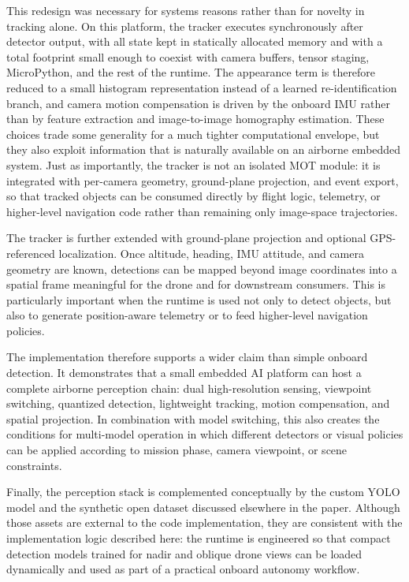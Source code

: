 This redesign was necessary for systems reasons rather than for novelty
in tracking alone. On this platform, the tracker executes synchronously
after detector output, with all state kept in statically allocated
memory and with a total footprint small enough to coexist with camera
buffers, tensor staging, MicroPython, and the rest of the runtime. The
appearance term is therefore reduced to a small histogram representation
instead of a learned re-identification branch, and camera motion
compensation is driven by the onboard IMU rather than by feature
extraction and image-to-image homography estimation. These choices trade
some generality for a much tighter computational envelope, but they also
exploit information that is naturally available on an airborne embedded
system. Just as importantly, the tracker is not an isolated MOT module:
it is integrated with per-camera geometry, ground-plane projection, and
event export, so that tracked objects can be consumed directly by flight
logic, telemetry, or higher-level navigation code rather than remaining
only image-space trajectories.

The tracker is further extended with ground-plane projection and
optional GPS-referenced localization. Once altitude, heading, IMU
attitude, and camera geometry are known, detections can be mapped beyond
image coordinates into a spatial frame meaningful for the drone and for
downstream consumers. This is particularly important when the runtime is
used not only to detect objects, but also to generate position-aware
telemetry or to feed higher-level navigation policies.

The implementation therefore supports a wider claim than simple onboard
detection. It demonstrates that a small embedded AI platform can host a
complete airborne perception chain: dual high-resolution sensing,
viewpoint switching, quantized detection, lightweight tracking, motion
compensation, and spatial projection. In combination with model
switching, this also creates the conditions for multi-model operation in
which different detectors or visual policies can be applied according to
mission phase, camera viewpoint, or scene constraints.

Finally, the perception stack is complemented conceptually by the custom
YOLO model and the synthetic open dataset discussed elsewhere in the
paper. Although those assets are external to the code implementation,
they are consistent with the implementation logic described here: the
runtime is engineered so that compact detection models trained for nadir
and oblique drone views can be loaded dynamically and used as part of a
practical onboard autonomy workflow.
